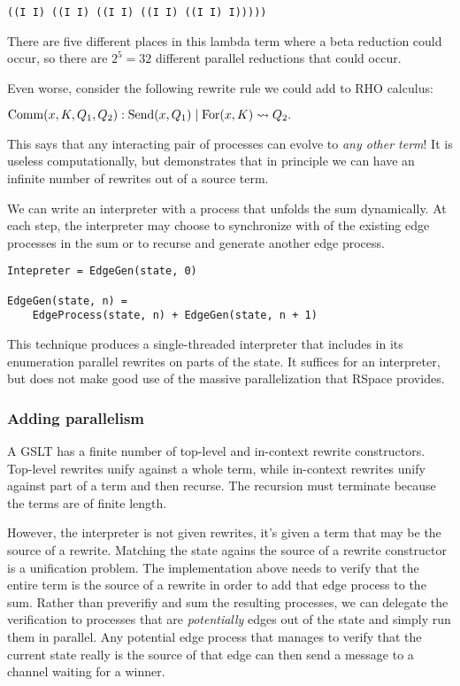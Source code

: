 \documentclass{article}
\begin{document}
\begin{verbatim}
((I I) ((I I) ((I I) ((I I) ((I I) I)))))
\end{verbatim}

There are five different places in this lambda term where a beta reduction could occur, so there are $2^5 = 32$ different parallel reductions that could occur.

Even worse, consider the following rewrite rule we could add to RHO calculus: \bigskip

\noindent ${\rm Comm}(x, K, Q_1, Q_2): {\rm Send}(x, Q_1) \;|\; {\rm For}(x, K) \leadsto Q_2.$ \bigskip

\noindent This says that any interacting pair of processes can evolve to {\em any other term}!  It is useless computationally, but demonstrates that in principle we can have an infinite number of rewrites out of a source term.

We can write an interpreter with a process that unfolds the sum dynamically.  At each step, the interpreter may choose to synchronize with of the existing edge processes in the sum or to recurse and generate another edge process.

\begin{verbatim}
Intepreter = EdgeGen(state, 0)

EdgeGen(state, n) =
    EdgeProcess(state, n) + EdgeGen(state, n + 1)
\end{verbatim}

This technique produces a single-threaded interpreter that includes in its enumeration parallel rewrites on parts of the state.  It suffices for an interpreter, but does not make good use of the massive parallelization that RSpace provides.

\subsubsection{Adding parallelism}

A GSLT has a finite number of top-level and in-context rewrite constructors.  Top-level rewrites unify against a whole term, while in-context rewrites unify against part of a term and then recurse.  The recursion must terminate because the terms are of finite length.

However, the interpreter is not given rewrites, it's given a term that may be the source of a rewrite.  Matching the state agains the source of a rewrite constructor is a unification problem.  The implementation above needs to verify that the entire term is the source of a rewrite in order to add that edge process to the sum.  Rather than preverifiy and sum the resulting processes, we can delegate the verification to processes that are {\em potentially} edges out of the state and simply run them in parallel.  Any potential edge process that manages to verify that the current state really is the source of that edge can then send a message to a channel waiting for a winner.
\end{document}
